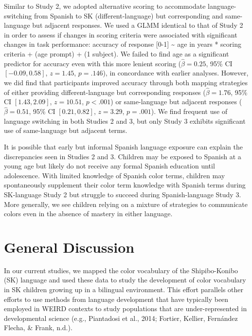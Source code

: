 \documentclass[
  english,
  ,man,floatsintext]{apa6}
\begin{document}
Similar to Study 2, we adopted alternative scoring to accommodate language-switching from Spanish to SK (different-language) but corresponding and same-language but adjacent responses. We used a GLMM identical to that of Study 2 in order to assess if changes in scoring criteria were associated with significant changes in task performance: accuracy of response {[}0-1{]} \textasciitilde{} age in years * scoring criteria + (age \textbar{} prompt) + (1 \textbar{} subject). We failed to find age as a significant predictor for accuracy even with this more lenient scoring (\(\hat{\beta} = 0.25\), 95\% CI \([-0.09, 0.58]\), \(z = 1.45\), \(p = .146\)), in concordance with earlier analyses. However, we did find that participants improved accuracy through both mapping strategies of either providing different-language but corresponding responses (\(\hat{\beta} = 1.76\), 95\% CI \([1.43, 2.09]\), \(z = 10.51\), \(p < .001\)) or same-language but adjacent responses (\(\hat{\beta} = 0.51\), 95\% CI \([0.21, 0.82]\), \(z = 3.29\), \(p = .001\)). We find frequent use of language switching in both Studies 2 and 3, but only Study 3 exhibits significant use of same-language but adjacent terms.

It is possible that early but informal Spanish language exposure can explain the discrepancies seen in Studies 2 and 3. Children may be exposed to Spanish at a young age but likely do not receive any formal Spanish education until adolescence. With limited knowledge of Spanish color terms, children may spontaneously supplement their color term knowledge with Spanish terms during SK-language Study 2 but struggle to succeed during Spanish-language Study 3. More generally, we see children relying on a mixture of strategies to communicate colors even in the absence of mastery in either language.

\hypertarget{general-discussion}{%
\section{General Discussion}\label{general-discussion}}

In our current studies, we mapped the color vocabulary of the Shipibo-Konibo (SK) language and used these data to study the development of color vocabulary in SK children growing up in a bilingual environment. This effort parallels other efforts to use methods from language development that have typically been employed in WEIRD contexts to study populations that are under-represented in developmental science (e.g., Piantadosi et al., 2014; Fortier, Kellier, Fernández Flecha, \& Frank, n.d.).
\end{document}
